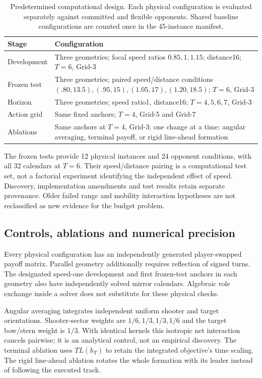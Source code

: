 \begin{table}[t]
\centering\small
\caption{Predetermined computational design. Each physical configuration is evaluated separately against committed and flexible opponents. Shared baseline configurations are counted once in the 45-instance manifest.}\label{tab:design}
\begin{tabular}{p{.19\linewidth}p{.69\linewidth}}
\toprule
Stage & Configuration \\
\midrule
Development & Three geometries; focal speed ratios $0.85,1,1.15$; distance16; $T=6$, Grid-3 \\
Frozen test & Three geometries; paired speed/distance conditions $(.80,13.5),(.95,15),(1.05,17),(1.20,18.5)$; $T=6$, Grid-3 \\
Horizon & Three geometries; speed ratio1, distance16; $T=4,5,6,7$, Grid-3 \\
Action grid & Same fixed anchors; $T=4$, Grid-5 and Grid-7 \\
Ablations & Same anchors at $T=4$, Grid-3; one change at a time: angular averaging, terminal payoff, or rigid line-ahead formation \\
\bottomrule
\end{tabular}
\end{table}
The frozen tests provide 12 physical instances and 24 opponent conditions,
with all 32 calendars at $T=6$. Their speed/distance pairing is a computational
test set, not a factorial experiment identifying the independent effect of
speed. Discovery, implementation amendments and test results retain separate
provenance. Older failed range and mobility interaction hypotheses are not
reclassified as new evidence for the budget problem.

\subsection{Controls, ablations and numerical precision}
Every physical configuration has an independently generated player-swapped
payoff matrix. Parallel geometry additionally requires reflection of signed
turns. The designated speed-one development and first frozen-test anchors
in each geometry also have independently solved mirror calendars. Algebraic
role exchange inside a solver does not substitute for these physical checks.

Angular averaging integrates independent uniform shooter and target
orientations. Shooter-sector weights are $1/6,1/3,1/3,1/6$ and the target
bow/stern weight is $1/3$. With identical kernels this isotropic net
interaction cancels pairwise; it is an analytical control, not an empirical
discovery. The terminal ablation uses $T L(h_T)$ to retain the integrated
objective's time scaling. The rigid line-ahead ablation rotates the whole
formation with its leader instead of following the executed track.

